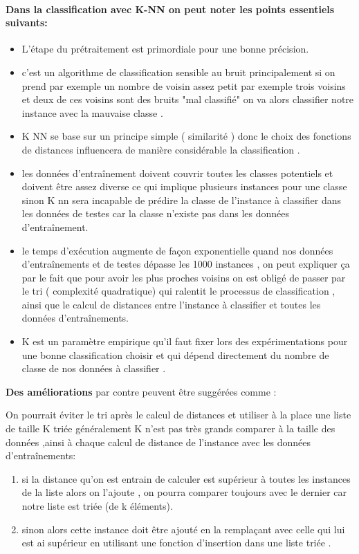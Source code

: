 \documentclass[12pt,a4paper,oneside]{book}
\begin{document}
\paragraph{ Dans la classification avec K-NN on peut noter les points essentiels suivants:}
 \begin{itemize}
 	\item L'étape du prétraitement est primordiale pour une bonne précision.
 	\item c'est un algorithme de classification sensible au bruit principalement si on prend par exemple un nombre de voisin assez petit par exemple trois voisins et deux de ces voisins sont des bruits "mal classifié" on va alors classifier notre instance avec la mauvaise classe .
 	\item K NN  se base sur un principe simple ( similarité ) donc le choix des fonctions de distances  influencera de manière considérable la classification .
 	\item les données d'entraînement doivent couvrir toutes les classes potentiels et doivent être assez diverse ce qui implique plusieurs instances pour une classe sinon K nn sera incapable de  prédire la classe de l'instance à classifier dans les données de testes car la classe n'existe pas dans les données d'entraînement.
 	\item le temps d'exécution augmente de façon exponentielle quand nos données d'entraînements et de testes dépasse les 1000 instances , on peut expliquer ça par le fait que pour avoir les plus proches voisins on est obligé de passer par le tri ( complexité quadratique) qui ralentit  le processus de classification , ainsi que le calcul de distances entre l'instance à classifier et toutes les données d'entraînements.
 	\item K est un paramètre empirique qu'il faut fixer lors des expérimentations pour une bonne classification choisir et qui dépend directement du nombre de classe de nos données  à classifier .
 	
 \end{itemize}
 
 
\textbf{Des améliorations} par contre peuvent être suggérées comme :

On pourrait éviter le tri après le calcul de distances et utiliser à la place une liste de taille K triée généralement K n'est pas très grands  comparer  à la taille des données ,ainsi à chaque calcul de distance de l'instance avec les données d'entraînements:
\begin{enumerate}
	\item  si la distance qu'on est entrain de calculer 
	est supérieur à toutes les instances de la liste alors on l'ajoute , on pourra comparer toujours avec le dernier car notre liste est triée (de k éléments).
	\item sinon
	alors cette instance doit être ajouté en la remplaçant avec celle qui lui est ai supérieur en utilisant une fonction d'insertion dans une liste triée .
	
	
\end{enumerate}  
\end{document}
